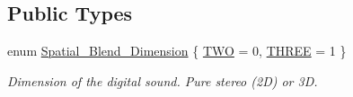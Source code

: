 \subsection*{Public Types}
\begin{DoxyCompactItemize}
\item 
enum \mbox{\hyperlink{classprz_1_1_audio___track_a4fb1dc3dd45713ba4c3e56918721d12a}{Spatial\+\_\+\+Blend\+\_\+\+Dimension}} \{ \mbox{\hyperlink{classprz_1_1_audio___track_a4fb1dc3dd45713ba4c3e56918721d12aa43821963797a936302adb2b0909da866}{T\+WO}} = 0, 
\mbox{\hyperlink{classprz_1_1_audio___track_a4fb1dc3dd45713ba4c3e56918721d12aae008fd40b2713ad1259054014d113239}{T\+H\+R\+EE}} = 1
 \}
\begin{DoxyCompactList}\small\item\em Dimension of the digital sound. Pure stereo (2D) or 3D. \end{DoxyCompactList}\end{DoxyCompactItemize}
